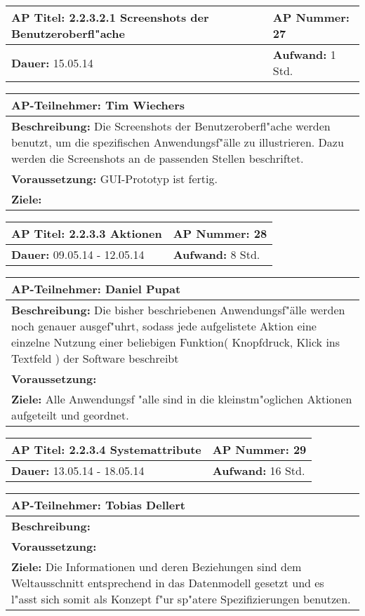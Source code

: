 \begin{tabular}{|p{7.43cm}|p{7.43cm}|}
\hline
\textbf{AP Titel: }2.2.3.2.1 Screenshots der Benutzeroberfl"ache& \textbf{AP Nummer: }27\\ 
\hline
\textbf{Dauer: }15.05.14& \textbf{Aufwand: } 1 Std.\\
\hline
\end{tabular}
\begin{tabular}{|p{15.3cm}|}
\hline
\textbf{AP-Teilnehmer: }Tim Wiechers\\
\hline
\textbf{Beschreibung: }Die Screenshots der Benutzeroberfl"ache werden benutzt, um die spezifischen Anwendungsf"älle zu illustrieren. Dazu werden die Screenshots an de passenden Stellen beschriftet.\\
\hline
\textbf{Voraussetzung: }GUI-Prototyp ist fertig.\\
\hline 
\textbf{Ziele: }\\
\hline 
\end{tabular}

\begin{tabular}{|p{7.43cm}|p{7.43cm}|}
\hline
\textbf{AP Titel: }2.2.3.3 Aktionen& \textbf{AP Nummer: }28\\ 
\hline
\textbf{Dauer: }09.05.14 - 12.05.14& \textbf{Aufwand: } 8 Std.\\
\hline
\end{tabular}
\begin{tabular}{|p{15.3cm}|}
\hline
\textbf{AP-Teilnehmer: }Daniel Pupat\\
\hline
\textbf{Beschreibung: }Die bisher beschriebenen Anwendungsf"älle werden noch genauer ausgef"uhrt, sodass jede aufgelistete Aktion eine einzelne Nutzung einer beliebigen Funktion( Knopfdruck, Klick ins Textfeld ) der Software beschreibt\\
\hline
\textbf{Voraussetzung: }\\
\hline 
\textbf{Ziele: }Alle Anwendungsf "alle sind in die kleinstm"oglichen Aktionen aufgeteilt und geordnet.\\
\hline 
\end{tabular}

\begin{tabular}{|p{7.43cm}|p{7.43cm}|}
\hline
\textbf{AP Titel: }2.2.3.4 Systemattribute& \textbf{AP Nummer: }29\\ 
\hline
\textbf{Dauer: }13.05.14 - 18.05.14& \textbf{Aufwand: } 16 Std.\\
\hline
\end{tabular}
\begin{tabular}{|p{15.3cm}|}
\hline
\textbf{AP-Teilnehmer: }Tobias Dellert\\
\hline
\textbf{Beschreibung: }\\
\hline
\textbf{Voraussetzung: }\\
\hline 
\textbf{Ziele: }Die Informationen und deren Beziehungen sind dem Weltausschnitt entsprechend in das Datenmodell gesetzt und es l"asst sich somit als Konzept f"ur sp"atere Spezifizierungen benutzen.\\
\hline 
\end{tabular}

